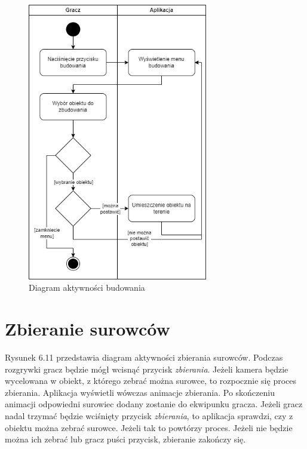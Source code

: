 \begin{figure}[H]
    \centering
        \includegraphics[width=0.7\textwidth]{Graphics/activities/build.png}
         \caption{Diagram aktywności budowania}
\end{figure}

\clearpage

\section{Zbieranie surowców}

Rysunek 6.11 przedstawia diagram aktywności zbierania surowców.
Podczas rozgrywki gracz będzie mógł wcisnąć przycisk \textit{zbierania}. Jeżeli kamera będzie wycelowana w obiekt, z którego zebrać można surowce, to rozpocznie się proces zbierania. Aplikacja wyświetli wówczas animacje zbierania. Po skończeniu animacji odpowiedni surowiec dodany zostanie do ekwipunku gracza. Jeżeli gracz nadal trzymać będzie wciśnięty przycisk \textit{zbierania}, to aplikacja sprawdzi, czy z obiektu można zebrać surowce. Jeżeli tak to powtórzy proces. Jeżeli nie będzie można ich zebrać lub gracz puści przycisk, zbieranie zakończy się.

